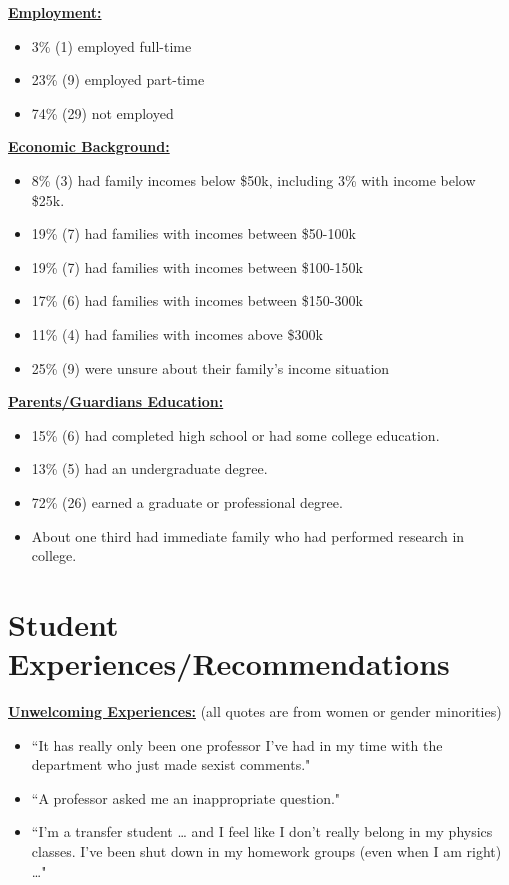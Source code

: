 \documentclass[oneside]{book}   %
\begin{document}
\noindent\underline{\textbf{Employment:}}
\begin{itemize}
	\item 3\% (1) employed full-time
	\item 23\% (9) employed part-time
	\item 74\% (29) not employed
\end{itemize}

\noindent\underline{\textbf{Economic Background:}}
\begin{itemize}
	\item 8\% (3) had family incomes below \$50k, including 3\% with income below \$25k.
	\item 19\% (7) had families with incomes between \$50-100k
	\item 19\% (7) had families with incomes between \$100-150k
	\item 17\% (6) had families with incomes between \$150-300k
	\item 11\% (4) had families with incomes above \$300k
	\item 25\% (9) were unsure about their family's income situation
\end{itemize}

\noindent\underline{\textbf{Parents/Guardians Education:}}
\begin{itemize}
	\item 15\% (6) had completed high school or had some college education.
	\item 13\% (5) had an undergraduate degree.
	\item 72\% (26) earned a graduate or professional degree.
	\item About one third had immediate family who had performed research in college.
\end{itemize}

\section{Student Experiences/Recommendations}
\noindent\underline{\textbf{Unwelcoming Experiences:}} (all quotes are from women or gender minorities)
\begin{itemize}
	\item ``It has really only been one professor I’ve had in my time with the department who just made sexist comments."
	\item ``A professor asked me an inappropriate question."
	\item ``I’m a transfer student … and I feel like I don’t really belong in my physics classes. I’ve been shut down in my homework groups (even when I am right) …"
\end{itemize}
\end{document}
